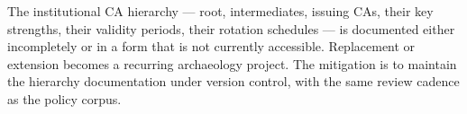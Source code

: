 \begin{pitfallbox}
\noindent The institutional CA hierarchy --- root, intermediates,
issuing CAs, their key strengths, their validity periods, their
rotation schedules --- is documented either incompletely or in a
form that is not currently accessible. Replacement or extension
becomes a recurring archaeology project. The mitigation is to
maintain the hierarchy documentation under version control, with
the same review cadence as the policy corpus.
\end{pitfallbox}
